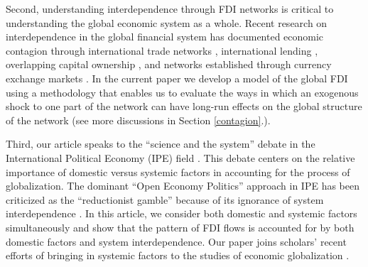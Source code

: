 \documentclass[reqno,onecolumn,letterpaper,12pt]{article}
\begin{document}
{%

Second, understanding interdependence through FDI networks is critical to understanding the global economic system as a whole.  Recent research on interdependence in the global financial system has documented economic contagion through international trade networks \citep{kali2010financial},  international lending \citep{zakaria2017evidence,Oatley_et_al:2013}, overlapping capital ownership \citep{chuluun2017global}, and networks established through currency exchange markets \citep{matesanz2014network}. In the current paper we develop a model of the global FDI using a methodology that enables us to evaluate the ways in which an exogenous shock to one part of the network can have long-run effects on the global structure of the network (see more discussions in Section \ref{contagion}.). %

Third, our article speaks to the ``science and the system'' debate in the International Political Economy (IPE) field \citep[see,][]{Chaudoin_Milner:2017,Oatley:2011,Chaudoin_et_al:2014,Cohen:2008,Drezner_McNamara:2013}. This debate centers on the relative importance of domestic versus systemic factors in accounting for the process of globalization. The dominant ``Open Economy Politics'' approach \citep{Lake:2009} in IPE has been criticized as the ``reductionist gamble'' because of its ignorance of system interdependence \citep{Oatley:2011}. In this article, we consider both domestic and systemic factors simultaneously and show that the pattern of FDI flows is accounted for by both domestic factors and system interdependence. Our paper joins scholars' recent efforts of bringing in systemic factors to the studies of economic globalization \cite[see,~e.g.,][]{Chaudoin_et_al:2014,ward2013gravity,cao2014democracies,Chaudoin_Wilf:2018,Hafner-Burton:2009}.

}
\end{document}
